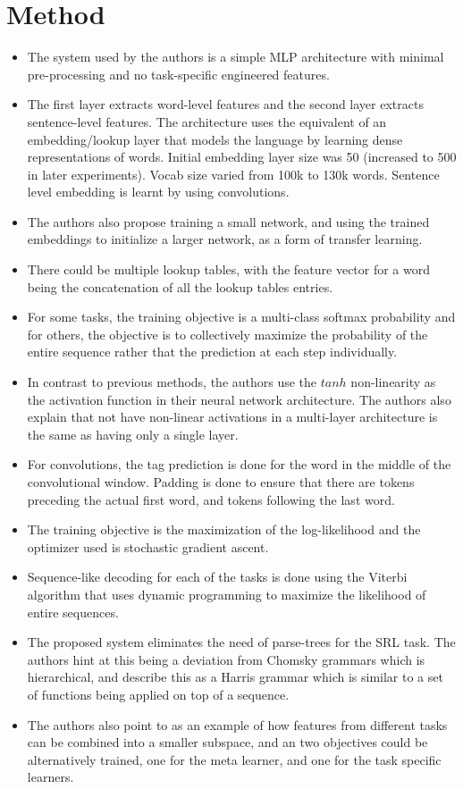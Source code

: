 \documentclass[12pt]{scrartcl}
\begin{document}
\section{Method}
  \begin{itemize}
    \item The system used by the authors is a simple MLP architecture with minimal pre-processing and no task-specific engineered features.
    \item The first layer extracts word-level features and the second layer extracts sentence-level features. The architecture uses the equivalent of an embedding/lookup layer that models the language by learning dense representations of words. Initial embedding layer size was 50 (increased to 500 in later experiments). Vocab size varied from 100k to 130k words. Sentence level embedding is learnt by using convolutions.
    \item The authors also propose training a small network, and using the trained embeddings to initialize a larger network, as a form of transfer learning.
    \item There could be multiple lookup tables, with the feature vector for a word being the concatenation of all the lookup tables entries.
    \item For some tasks, the training objective is a multi-class softmax probability and for others, the objective is to collectively maximize the probability of the entire sequence rather that the prediction at each step individually.
    \item In contrast to previous methods, the authors use the $tanh$ non-linearity as the activation function in their neural network architecture. The authors also explain that not have non-linear activations in a multi-layer architecture is the same as having only a single layer.
    \item For convolutions, the tag prediction is done for the word in the middle of the convolutional window. Padding is done to ensure that there are tokens preceding the actual first word, and tokens following the last word.
    \item The training objective is the maximization of the log-likelihood and the optimizer used is stochastic gradient ascent.
    \item Sequence-like decoding for each of the tasks is done using the Viterbi algorithm that uses dynamic programming to maximize the likelihood of entire sequences.
    \item The proposed system eliminates the need of parse-trees for the SRL task. The authors hint at this being a deviation from Chomsky grammars which is hierarchical, and describe this as a Harris grammar which is similar to a set of functions being applied on top of a sequence.
    \item The authors also point to \cite{ando2005framework} as an example of how features from different tasks can be combined into a smaller subspace, and an two objectives could be alternatively trained, one for the meta learner, and one for the task specific learners.
  \end{itemize}
\end{document}

